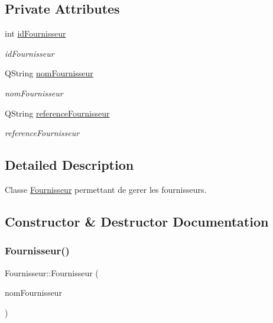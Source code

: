 \subsection*{Private Attributes}
\begin{DoxyCompactItemize}
\item 
\mbox{\label{class_fournisseur_a7e20f04bae2fcca26d00d68a4e68352e}} 
int \mbox{\hyperlink{class_fournisseur_a7e20f04bae2fcca26d00d68a4e68352e}{id\+Fournisseur}}
\begin{DoxyCompactList}\small\item\em id\+Fournisseur \end{DoxyCompactList}\item 
\mbox{\label{class_fournisseur_a720c9ecc464a5dd2b999df1bcd70c95f}} 
Q\+String \mbox{\hyperlink{class_fournisseur_a720c9ecc464a5dd2b999df1bcd70c95f}{nom\+Fournisseur}}
\begin{DoxyCompactList}\small\item\em nom\+Fournisseur \end{DoxyCompactList}\item 
\mbox{\label{class_fournisseur_a3f6d46842ec2ce1879db25254cc7728d}} 
Q\+String \mbox{\hyperlink{class_fournisseur_a3f6d46842ec2ce1879db25254cc7728d}{reference\+Fournisseur}}
\begin{DoxyCompactList}\small\item\em reference\+Fournisseur \end{DoxyCompactList}\end{DoxyCompactItemize}


\subsection{Detailed Description}
Classe \mbox{\hyperlink{class_fournisseur}{Fournisseur}} permettant de gerer les fournisseurs. 

\subsection{Constructor \& Destructor Documentation}
\mbox{\label{class_fournisseur_a81aa41d5b1039e9816da11048e1970f4}} 
\subsubsection{\texorpdfstring{Fournisseur()}{Fournisseur()}}
{\footnotesize\ttfamily Fournisseur\+::\+Fournisseur (\begin{DoxyParamCaption}\item[{Q\+String}]{nom\+Fournisseur }\end{DoxyParamCaption})}



